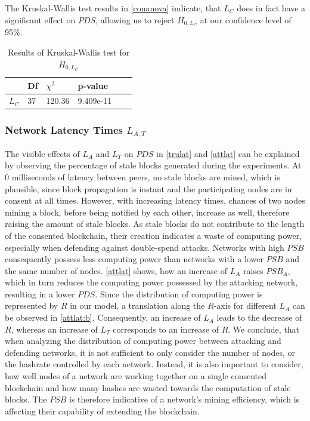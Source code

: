 \documentclass[a4paper,12pt,twoside]{report}
\begin{document}
The Kruskal-Wallis test results in \autoref{conanova} indicate, that $L_C$ does in fact have a significant effect on $PDS$, allowing us to reject $H_{0,L_C}$ at our confidence level of 95\%.
\begin{table}[hb]
\centering
\begin{tabular}{|l|l|l|l|l|l|} \hline
& Df & $\chi^{2}$ & p-value \\ \hline
$L_C$ & 37 &  120.36 & 9.409e-11 \\ \hline
\end{tabular}
\caption{Results of Kruskal-Wallis test for $H_{0,L_C}$}
\label{conanova}
\end{table}
\subsubsection{Network Latency Times $L_{A,T}$}
The visible effects of $L_{A}$ and $L_{T}$ on $PDS$ in \autoref{trulat} and \autoref{attlat} can be explained by observing the percentage of stale blocks generated during the experiments. At 0 milliseconds of latency between peers, no stale blocks are mined, which is plausible, since block propagation is instant and the participating nodes are in consent at all times. However, with increasing latency times, chances of two nodes mining a block, before being notified by each other, increase as well, therefore raising the amount of stale blocks. As stale blocks do not contribute to the length of the consented blockchain, their creation indicates a waste of computing power, especially when defending against double-spend attacks. Networks with high $PSB$ consequently possess less computing power than networks with a lower $PSB$ and the same number of nodes. \autoref{attlat} shows, how an increase of $L_{A}$ raises $PSB_A$, which in turn reduces the computing power possessed by the attacking network, resulting in a lower $PDS$. Since the distribution of computing power is represented by $R$ in our model, a translation along the $R$-axis for different $L_{A}$ can be observed in \autoref{attlat:b}. Consequently, an increase of $L_{A}$ leads to the decrease of $R$, whereas an increase of $L_{T}$ corresponds to an increase of $R$. We conclude, that when analyzing the distribution of computing power between attacking and defending networks, it is not sufficient to only consider the number of nodes, or the hashrate controlled by each network. Instead, it is also important to consider, how well nodes of a network are working together on a single consented blockchain and how many hashes are wasted towards the computation of stale blocks. The $PSB$ is therefore indicative of a network's mining efficiency, which is affecting their capability of extending the blockchain. 
\end{document}
